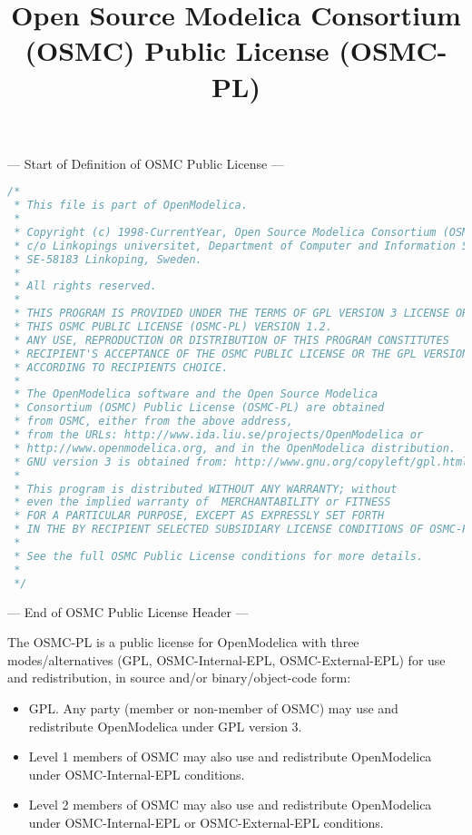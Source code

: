\documentclass[a4paper, 12pt]{article}
\begin{document}
\title{Open Source Modelica Consortium (OSMC) Public License (OSMC-PL)}
\date{}

\maketitle
--- Start of Definition of OSMC Public License ---

\begin{lstlisting}[language=c++,
  breakatwhitespace=true,
  breaklines=true]
/*
 * This file is part of OpenModelica.
 *
 * Copyright (c) 1998-CurrentYear, Open Source Modelica Consortium (OSMC),
 * c/o Linkopings universitet, Department of Computer and Information Science,
 * SE-58183 Linkoping, Sweden.
 *
 * All rights reserved.
 *
 * THIS PROGRAM IS PROVIDED UNDER THE TERMS OF GPL VERSION 3 LICENSE OR
 * THIS OSMC PUBLIC LICENSE (OSMC-PL) VERSION 1.2.
 * ANY USE, REPRODUCTION OR DISTRIBUTION OF THIS PROGRAM CONSTITUTES
 * RECIPIENT'S ACCEPTANCE OF THE OSMC PUBLIC LICENSE OR THE GPL VERSION 3,
 * ACCORDING TO RECIPIENTS CHOICE.
 *
 * The OpenModelica software and the Open Source Modelica
 * Consortium (OSMC) Public License (OSMC-PL) are obtained
 * from OSMC, either from the above address,
 * from the URLs: http://www.ida.liu.se/projects/OpenModelica or
 * http://www.openmodelica.org, and in the OpenModelica distribution.
 * GNU version 3 is obtained from: http://www.gnu.org/copyleft/gpl.html.
 *
 * This program is distributed WITHOUT ANY WARRANTY; without
 * even the implied warranty of  MERCHANTABILITY or FITNESS
 * FOR A PARTICULAR PURPOSE, EXCEPT AS EXPRESSLY SET FORTH
 * IN THE BY RECIPIENT SELECTED SUBSIDIARY LICENSE CONDITIONS OF OSMC-PL.
 *
 * See the full OSMC Public License conditions for more details.
 *
 */
\end{lstlisting}

--- End of OSMC Public License Header ---

\vspace{1cm}

The OSMC-PL is a public license for OpenModelica with three modes/alternatives (GPL, OSMC-Internal-EPL, OSMC-External-EPL) for use and redistribution, in source and/or binary/object-code form:
\begin{itemize}
\item GPL. Any party (member or non-member of OSMC) may use and redistribute
 OpenModelica under GPL version 3.
\item Level 1 members of OSMC may also use and redistribute OpenModelica under
 OSMC-Internal-EPL conditions.
\item Level 2 members of OSMC may also use and redistribute OpenModelica under
 OSMC-Internal-EPL or OSMC-External-EPL conditions.
\end{itemize}
\end{document}

